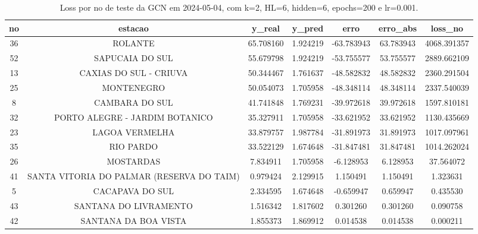 \begin{table}[h]
\centering
\caption{Loss por no de teste da GCN em 2024-05-04, com k=2, HL=6, hidden=6, epochs=200 e lr=0.001.}
\label{tab:gcn_loss_k2_hl6_h6_e200_d20240504}
\begin{tabular}{ccccccc}
\toprule
no & estacao & y\_real & y\_pred & erro & erro\_abs & loss\_no \\
\midrule
36 & ROLANTE & 65.708160 & 1.924219 & -63.783943 & 63.783943 & 4068.391357 \\
52 & SAPUCAIA DO SUL & 55.679798 & 1.924219 & -53.755577 & 53.755577 & 2889.662109 \\
13 & CAXIAS DO SUL - CRIUVA & 50.344467 & 1.761637 & -48.582832 & 48.582832 & 2360.291504 \\
25 & MONTENEGRO & 50.054073 & 1.705958 & -48.348114 & 48.348114 & 2337.540039 \\
8 & CAMBARA DO SUL & 41.741848 & 1.769231 & -39.972618 & 39.972618 & 1597.810181 \\
32 & PORTO ALEGRE - JARDIM BOTANICO & 35.327911 & 1.705958 & -33.621952 & 33.621952 & 1130.435669 \\
23 & LAGOA VERMELHA & 33.879757 & 1.987784 & -31.891973 & 31.891973 & 1017.097961 \\
35 & RIO PARDO & 33.522129 & 1.674648 & -31.847481 & 31.847481 & 1014.262024 \\
26 & MOSTARDAS & 7.834911 & 1.705958 & -6.128953 & 6.128953 & 37.564072 \\
41 & SANTA VITORIA DO PALMAR (RESERVA DO TAIM) & 0.979424 & 2.129915 & 1.150491 & 1.150491 & 1.323631 \\
5 & CACAPAVA DO SUL & 2.334595 & 1.674648 & -0.659947 & 0.659947 & 0.435530 \\
43 & SANTANA DO LIVRAMENTO & 1.516342 & 1.817602 & 0.301260 & 0.301260 & 0.090758 \\
42 & SANTANA DA BOA VISTA & 1.855373 & 1.869912 & 0.014538 & 0.014538 & 0.000211 \\
\bottomrule
\end{tabular}
\end{table}
